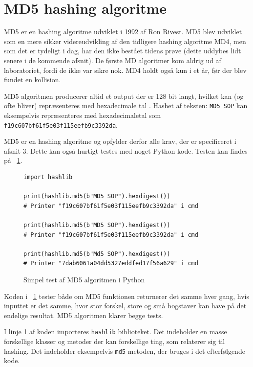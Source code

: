 \documentclass[12pt]{article}
\begin{document}
\section{MD5 hashing algoritme}

MD5 er en hashing algoritme udviklet i 1992 af Ron Rivest. MD5 blev udviklet som en mere sikker videreudvikling af den tidligere hashing algoritme MD4, men som det er tydeligt i dag, har den ikke bestået tidens prøve (dette uddybes lidt senere  i de kommende afsnit). De første MD algoritmer kom aldrig ud af laboratoriet, fordi de ikke var sikre nok. MD4 holdt også kun i et år, før der blev fundet en kollision. \cite{lake_md5_2021} 

MD5 algoritmen producerer altid et output der er 128 bit langt, hvilket kan (og ofte bliver) repræsenteres med hexadecimale tal \cite{rivest_md5_1992}. Hashet af teksten: \verb|MD5 SOP| kan eksempelvis repræsenteres med hexadecimaletal som \verb|f19c607bf61f5e03f115eefb9c3392da|. 

MD5 er en hashing algoritme og opfylder derfor alle krav, der er specificeret i afsnit 3. Dette kan også hurtigt testes med noget Python kode. Testen kan findes på \figurename{~\ref{code:md5-test}}.


\begin{figure}[!ht]
\begin{verbatim}
import hashlib

print(hashlib.md5(b"MD5 SOP").hexdigest())
# Printer "f19c607bf61f5e03f115eefb9c3392da" i cmd

print(hashlib.md5(b"MD5 SOP").hexdigest())
# Printer "f19c607bf61f5e03f115eefb9c3392da" i cmd

print(hashlib.md5(b"Md5 SOP").hexdigest())
# Printer "7dab6061a04dd5327eddfed17f56a629" i cmd
\end{verbatim}
\caption{Simpel test af MD5 algoritmen i Python}
\label{code:md5-test}
\end{figure}
Koden i \figurename{~\ref{code:md5-test}} tester både om MD5 funktionen returnerer det samme hver gang, hvis inputtet er det samme, hvor stor forskel, store og små bogstaver kan have på det endelige resultat. MD5 algoritmen klarer begge tests. 

I linje 1 af koden importeres \verb|hashlib| biblioteket. Det indeholder en masse forskellige klasser og metoder der kan forskellige ting, som relaterer sig til hashing. Det indeholder eksempelvis \verb|md5| metoden, der bruges i det efterfølgende kode. 
\end{document}

